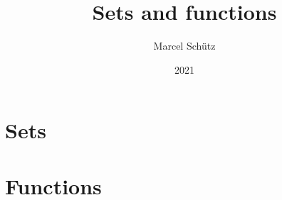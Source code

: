 \documentclass{article}
\title{Sets and functions}
\author{Marcel Schütz}
\date{2021}
\begin{document}
  \maketitle

  \tableofcontents

  \newpage
  \part{Sets}

  
  \begin{comment}
    \begin{forthel}
      [readtex \path{set-theory/sections/01_sets/01_sets.ftl.tex}]
    \end{forthel}
  \end{comment}

  \newpage
  
  \begin{comment}
    \begin{forthel}
      [readtex \path{set-theory/sections/01_sets/02_powerset.ftl.tex}]
    \end{forthel}
  \end{comment}

  \newpage
  
  \begin{comment}
    \begin{forthel}
      [readtex \path{set-theory/sections/01_sets/03_regularity.ftl.tex}]
    \end{forthel}
  \end{comment}

  \newpage
  
  \begin{comment}
    \begin{forthel}
      [readtex \path{set-theory/sections/01_sets/04_symmetric-difference.ftl.tex}]
    \end{forthel}
  \end{comment}

  \newpage
  
  \begin{comment}
    \begin{forthel}
      [readtex \path{set-theory/sections/01_sets/05_cartesian-product.ftl.tex}]
    \end{forthel}
  \end{comment}


  \newpage
  \part{Functions}
\end{document}
